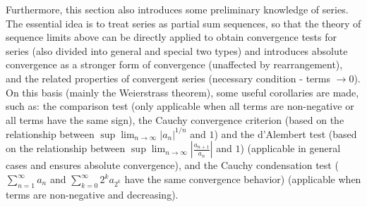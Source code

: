 Furthermore, this section also introduces some preliminary knowledge of series. The essential idea is to treat series as partial sum sequences, so 
that the theory of sequence limits above can be directly applied to obtain convergence tests for series (also divided into general and special two 
types) and introduces absolute convergence as a stronger form of convergence (unaffected by rearrangement), and the related properties of convergent 
series (necessary condition - terms $\to 0$). On this basis (mainly the Weierstrass theorem), some useful corollaries are made, such as: the comparison 
test (only applicable when all terms are non-negative or all terms have the same sign), the Cauchy convergence criterion (based on the relationship 
between $\sup \lim_{n\to\infty} |a_n|^{1/n}$ and $1$) and the d'Alembert test (based on the relationship between $\sup \lim_{n\to\infty} |\frac{a_{n+1}}{a_n}|$ 
and $1$) (applicable in general cases and ensures absolute convergence), and the Cauchy condensation test ($\sum_{n=1}^{\infty} a_n$ and 
$\sum_{k=0}^{\infty} 2^k a_{2^k}$ have the same convergence behavior) (applicable when terms are non-negative and decreasing).
\newline\newline
{}

